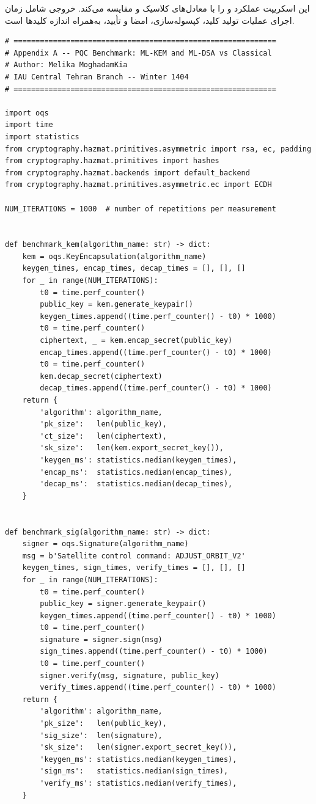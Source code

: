 \documentclass[a4paper,14pt]{extreport}
\begin{document}
این اسکریپت عملکرد  و  را با معادل‌های کلاسیک  و  مقایسه می‌کند.
خروجی شامل زمان اجرای عملیات تولید کلید، کپسوله‌سازی، امضا و تأیید، به‌همراه اندازه کلیدها است.

\vspace{0.3cm}

\begin{latin}
\small
\begin{verbatim}
# ============================================================
# Appendix A -- PQC Benchmark: ML-KEM and ML-DSA vs Classical
# Author: Melika MoghadamKia
# IAU Central Tehran Branch -- Winter 1404
# ============================================================

import oqs
import time
import statistics
from cryptography.hazmat.primitives.asymmetric import rsa, ec, padding
from cryptography.hazmat.primitives import hashes
from cryptography.hazmat.backends import default_backend
from cryptography.hazmat.primitives.asymmetric.ec import ECDH

NUM_ITERATIONS = 1000  # number of repetitions per measurement


def benchmark_kem(algorithm_name: str) -> dict:
    kem = oqs.KeyEncapsulation(algorithm_name)
    keygen_times, encap_times, decap_times = [], [], []
    for _ in range(NUM_ITERATIONS):
        t0 = time.perf_counter()
        public_key = kem.generate_keypair()
        keygen_times.append((time.perf_counter() - t0) * 1000)
        t0 = time.perf_counter()
        ciphertext, _ = kem.encap_secret(public_key)
        encap_times.append((time.perf_counter() - t0) * 1000)
        t0 = time.perf_counter()
        kem.decap_secret(ciphertext)
        decap_times.append((time.perf_counter() - t0) * 1000)
    return {
        'algorithm': algorithm_name,
        'pk_size':   len(public_key),
        'ct_size':   len(ciphertext),
        'sk_size':   len(kem.export_secret_key()),
        'keygen_ms': statistics.median(keygen_times),
        'encap_ms':  statistics.median(encap_times),
        'decap_ms':  statistics.median(decap_times),
    }


def benchmark_sig(algorithm_name: str) -> dict:
    signer = oqs.Signature(algorithm_name)
    msg = b'Satellite control command: ADJUST_ORBIT_V2'
    keygen_times, sign_times, verify_times = [], [], []
    for _ in range(NUM_ITERATIONS):
        t0 = time.perf_counter()
        public_key = signer.generate_keypair()
        keygen_times.append((time.perf_counter() - t0) * 1000)
        t0 = time.perf_counter()
        signature = signer.sign(msg)
        sign_times.append((time.perf_counter() - t0) * 1000)
        t0 = time.perf_counter()
        signer.verify(msg, signature, public_key)
        verify_times.append((time.perf_counter() - t0) * 1000)
    return {
        'algorithm': algorithm_name,
        'pk_size':   len(public_key),
        'sig_size':  len(signature),
        'sk_size':   len(signer.export_secret_key()),
        'keygen_ms': statistics.median(keygen_times),
        'sign_ms':   statistics.median(sign_times),
        'verify_ms': statistics.median(verify_times),
    }



\end{verbatim}
\end{latin}
\end{document}
